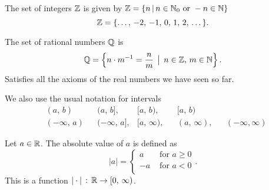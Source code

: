 \documentclass[10pt, a4paper]{article}
\begin{document}
\begin{definition}
    The set of integers $\mathbb{Z}$ is given by $\mathbb{Z} = \{n\, |\, n \in \mathbb{N}_0 \text{ or } -n \in \mathbb{N}\}$
    \[
    \mathbb{Z} = \{\dotsc,\,-2,\,-1,\,0,\,1,\,2,\,\dotsc\}.
    \]
\end{definition}

\begin{definition}
    The set of rational numbers $\mathbb{Q}$ is
    \[
    \mathbb{Q} = \left\{n \cdot m ^ {-1} = \frac{n}{m}\,\bigm\lvert\, n \in \mathbb{Z},\, m \in \mathbb{N}\right\}.
    \]
    Satisfies all the axioms of the real numbers we have seen so far. 
\end{definition}

We also use the usual notation for intervals
\begin{align*}
    &(a,\,b) & &(a,\, b], &[a,\,b), & &[a,\, b) \\
    &(-\infty,\,a) & &(-\infty,\, a], &[a,\,\infty), & &(a,\, \infty), & &(-\infty, \infty)
\end{align*}

\begin{definition}
    Let $a \in \mathbb{R}$. The absolute value of $a$ is defined as
    \[
    |a| = \begin{cases}
        a &\text{ for } a \geq 0 \\ 
        -a &\text{ for } a < 0 \\ 
    \end{cases}.
    \]
    This is a function $|\cdot|\,:\, \mathbb{R} \rightarrow [0,\,\infty)$.
\end{definition}
\end{document}
